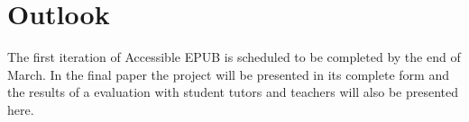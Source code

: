 \documentclass{llncs}
\begin{document}
\section{Outlook}
The first iteration of Accessible EPUB is scheduled to be completed by the end of March. In the final paper the project will be presented in its complete form and the results of a evaluation with student tutors and teachers will also be presented here. 


\end{document}
